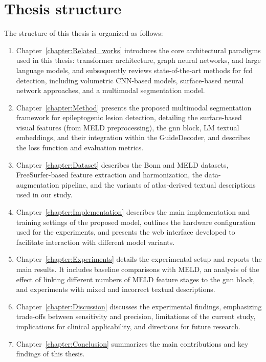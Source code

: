 \documentclass[FCD_GNN.tex]{subfiles}
\begin{document}
\section{Thesis structure}
The structure of this thesis is organized as follows:
\begin{enumerate}
    \item Chapter~\ref{chapter:Related_works} introduces the core architectural paradigms used in this thesis: transformer architecture, graph neural networks, and large language models, and subsequently reviews state-of-the-art methods for \ac{fcd} detection, including volumetric CNN-based models, surface-based neural network approaches, and a multimodal segmentation model.

    \item Chapter~\ref{chapter:Method} presents the proposed multimodal segmentation framework for epileptogenic lesion detection, detailing the surface-based visual features (from MELD preprocessing), the \acs{gnn} block, LM textual embeddings, and their integration within the GuideDecoder, and describes the loss function and evaluation metrics.

    \item Chapter~\ref{chapter:Dataset} describes the Bonn and MELD datasets, FreeSurfer-based feature extraction and harmonization, the data-augmentation pipeline, and the variants of atlas-derived textual descriptions used in our study.

    \item Chapter~\ref{chapter:Implementation} describes the main implementation and training settings of the proposed model, outlines the hardware configuration used for the experiments, and presents the web interface developed to facilitate interaction with different model variants.

    \item Chapter~\ref{chapter:Experiments} details the experimental setup and reports the main results. It includes baseline comparisons with MELD, an analysis of the effect of linking different numbers of MELD feature stages to the \acs{gnn} block, and experiments with mixed and incorrect textual descriptions.


    \item Chapter~\ref{chapter:Discussion} discusses the experimental findings, emphasizing trade-offs between sensitivity and precision, limitations of the current study, implications for clinical applicability, and directions for future research.

    \item Chapter~\ref{chapter:Conclusion} summarizes the main contributions and key findings of this thesis.

\end{enumerate}
\end{document}
